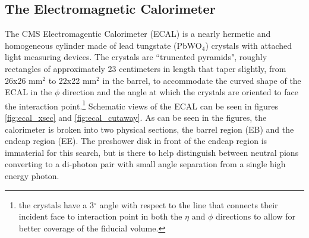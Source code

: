   \subsection{The Electromagnetic Calorimeter} \label{sec:ECAL}
    The CMS Electromagentic Calorimeter (ECAL) is a nearly hermetic and homogeneous cylinder made of lead tungstate (PbWO$_4$) crystals with attached light measuring devices. The crystals are ``truncated pyramids", roughly rectangles of approximately 23 centimeters in length that taper slightly, from 26x26 mm$^2$ to 22x22 mm$^2$ in the barrel\cite[pg. 4]{cms_ecal}, to accommodate the curved shape of the ECAL in the $\phi$ direction and the angle at which the crystals are oriented to face the interaction point.\footnote{the crystals have a 3$^\circ$ angle with respect to the line that connects their incident face to interaction point in both the $\eta$ and $\phi$ directions to allow for better coverage of the fiducial volume.} Schematic views of the ECAL can be seen in figures \ref{fig:ecal_xsec} and \ref{fig:ecal_cutaway}. As can be seen in the figures, the calorimeter is broken into two physical sections, the barrel region (EB) and the endcap region (EE). The preshower disk in front of the endcap region is immaterial for this search, but is there to help distinguish between neutral pions converting to a di-photon pair with small angle separation from a single high energy photon. 

